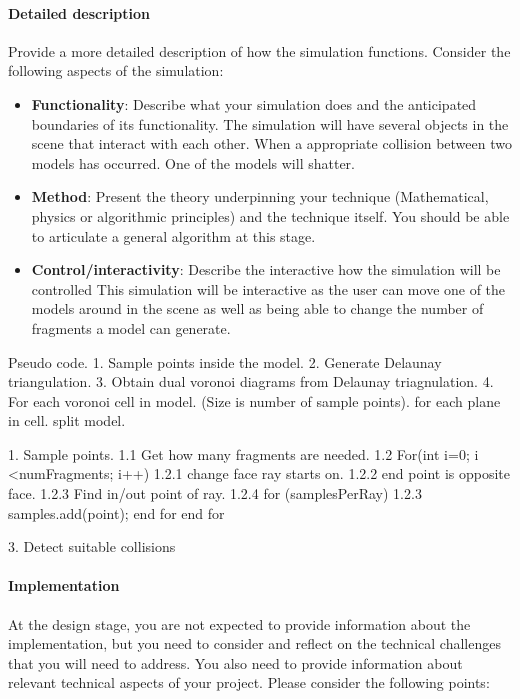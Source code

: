 \documentclass[conference,backref=page]{acmsiggraph}
\begin{document}
\paragraph{Detailed description}
Provide a more detailed description of how the simulation functions. Consider the following aspects of the simulation:
\begin{itemize}
\item {\bf Functionality}: Describe what your simulation does and the anticipated boundaries of its functionality.
 The simulation will have several objects in the scene that interact with each other. When a appropriate collision between two models has occurred. One of the models will shatter.
 
\item {\bf Method}: Present the theory underpinning your technique (Mathematical, physics or algorithmic principles) and the technique itself. You should be able to articulate a general algorithm at this stage.
\item {\bf Control/interactivity}: Describe the interactive how the simulation will be controlled
 This simulation will be interactive as the user can move one of the models around in the scene as well as being able to change the number of fragments a model can generate. 
\end{itemize}


















Pseudo code.
1. Sample points inside the model.
2. Generate Delaunay triangulation.
3. Obtain dual voronoi diagrams from Delaunay triagnulation.
4. For each voronoi cell in model. (Size is number of sample points).
		for each plane in cell.
				split model.



1. Sample points.
1.1 Get how many fragments are needed.
1.2 For(int i=0; i <numFragments; i++)
		1.2.1 change face ray starts on.
			1.2.2 end point is opposite face.
			 1.2.3 Find in/out point of ray.
			 1.2.4 for (samplesPerRay)
			    1.2.3 samples.add(point);
			    end for
			end for


3. Detect suitable collisions
\paragraph{Implementation}
At the design stage, you are not expected to provide information about the implementation, but you need to consider and reflect on the technical challenges that you will need to address. You also need to provide information about relevant technical aspects of your project. Please consider the following points:
\end{document}
